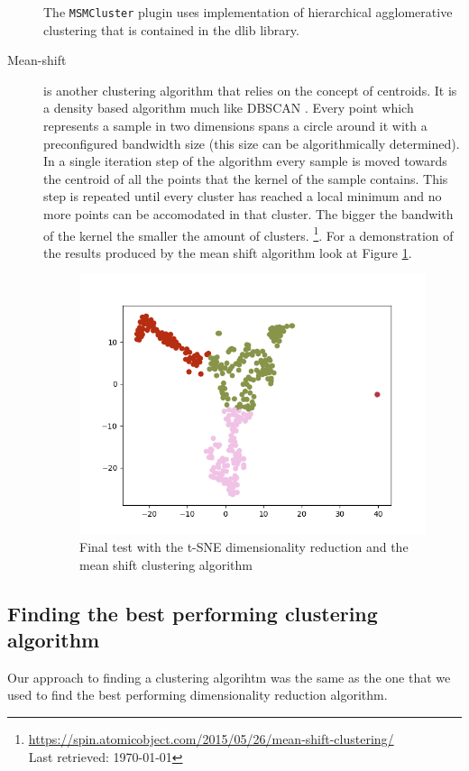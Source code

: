 \documentclass[journal]{vgtc}       %
\begin{document}
\begin{description}
The \verb|MSMCluster| plugin uses implementation of hierarchical agglomerative clustering that is contained in the dlib library. 
\item [Mean-shift] is another clustering algorithm that relies on the concept of centroids. It is a density based algorithm much like DBSCAN \cite{dlib09}.
Every point which represents a sample in two dimensions spans a circle around it with a preconfigured bandwidth size (this size can be algorithmically determined). In a single iteration step of the algorithm every sample is moved towards the centroid of all the points that the kernel of the sample contains. This step is repeated until every cluster has reached a local minimum and no more points can be accomodated in that cluster. The bigger the bandwith of the kernel the smaller the amount of clusters. \footnote{\url{https://spin.atomicobject.com/2015/05/26/mean-shift-clustering/}\\ Last retrieved: \today}. For a demonstration of the results produced by the mean shift algorithm look at Figure \ref{fig:tsne}. 

\begin{figure}[t]
	\begin{center}
		\includegraphics[width=.75\linewidth]{MS-tsne.png}
	\end{center}
	\caption{\label{fig:tsne} Final test with the t-SNE dimensionality reduction and the mean shift clustering algorithm }
\end{figure}


\end{description}


\subsection{Finding the best performing clustering algorithm}
Our approach to finding a clustering algorihtm was the same as the one that we used  to find the best performing dimensionality reduction algorithm.
\end{document}
